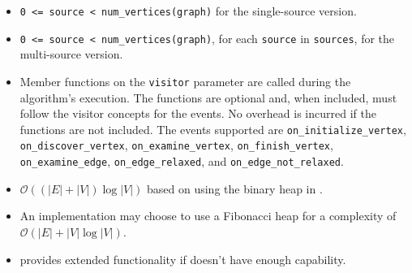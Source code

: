 \begin{itemdescr}
      \hardprecond
            \begin{itemize}
                  \item
                        \lstinline{0 <= source < num_vertices(graph)} for the single-source version.
            \end{itemize}
      \preconditions
            \begin{itemize}
                  \item
                        \lstinline{0 <= source < num_vertices(graph)}, for each \lstinline{source} in \lstinline{sources}, 
                                   for the multi-source version.
            \end{itemize}
      \pnum\effects
            \begin{itemize}
                  \item Member functions on the \lstinline{visitor} parameter are called during the algorithm's execution.
                        The functions are optional and, when included, must follow the visitor concepts for the events.
                        No overhead is incurred if the functions are not included.
                        The events supported are \lstinline{on_initialize_vertex}, \lstinline{on_discover_vertex},
                        \lstinline{on_examine_vertex}, \lstinline{on_finish_vertex}, \lstinline{on_examine_edge},
                        \lstinline{on_edge_relaxed}, and \lstinline{on_edge_not_relaxed}.
            \end{itemize}
      \pnum\complexity
            \begin{itemize}
                  \item $\mathcal{O}((|E| + |V|)\log{|V|})$ based on using the binary heap in .
                  \item An implementation may choose to use a Fibonacci heap for a complexity of $\mathcal{O}(|E| + |V|\log{|V|})$.
            \end{itemize}
      \pnum\remarks 
            \begin{itemize}
                  \item {} provides extended functionality if  doesn't have
                         enough capability.
            \end{itemize}
\end{itemdescr}





